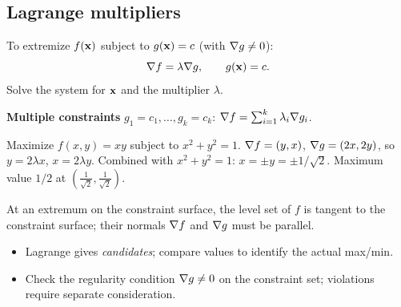 \subsection{Lagrange multipliers}
To extremize $f(\mathbf{x})$ subject to $g(\mathbf{x}) = c$ (with $\nabla g \neq 0$):
\[ \nabla f = \lambda \nabla g, \qquad g(\mathbf{x}) = c. \]
Solve the system for $\mathbf{x}$ and the multiplier $\lambda$.

\noindent\textbf{Multiple constraints} $g_1 = c_1, \ldots, g_k = c_k$:
$\nabla f = \sum_{i=1}^k \lambda_i \nabla g_i$.

\begin{example}
Maximize $f(x,y) = xy$ subject to $x^2 + y^2 = 1$.
$\nabla f = (y, x)$, $\nabla g = (2x, 2y)$, so $y = 2 \lambda x$, $x = 2 \lambda y$. Combined with
$x^2 + y^2 = 1$: $x = \pm y = \pm 1/\sqrt 2$. Maximum value $1/2$ at $(\tfrac{1}{\sqrt 2}, \tfrac{1}{\sqrt 2})$.
\end{example}

\begin{intuition}
At an extremum on the constraint surface, the level set of $f$ is tangent to the constraint
surface; their normals $\nabla f$ and $\nabla g$ must be parallel.
\end{intuition}

\begin{pitfallbox}
\begin{itemize}[leftmargin=*,nosep]
  \item Lagrange gives \emph{candidates}; compare values to identify the actual max/min.
  \item Check the regularity condition $\nabla g \neq 0$ on the constraint set;
        violations require separate consideration.
\end{itemize}
\end{pitfallbox}
